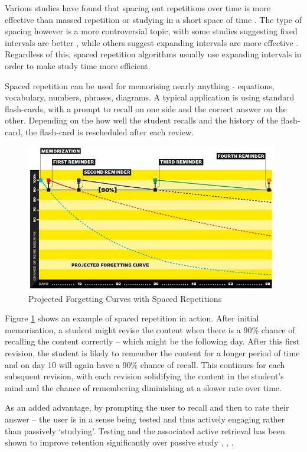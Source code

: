 Various studies have found that spacing out repetitions over time is
more effective than massed repetition or studying in a short space of time \cite{distributed_massed_2005}.
The type of spacing however is a more controversial topic, with some studies suggesting
fixed intervals are better \cite{fixed_intervals_2005}, while others suggest expanding intervals
are more effective \cite{effects_of_spacing_1963}. Regardless of this, spaced
repetition algorithms usually use expanding intervals in order to make study
time more efficient.

Spaced repetition can be used for memorising
nearly anything - equations, vocabulary, numbers, phrases, diagrams. A typical application
is using standard flash-cards, with a prompt to recall on one side and the correct answer on
the other. Depending on the how well the student recalls and the history of the flash-card, the
flash-card is rescheduled after each review. 

\begin{figure}[h!]
\includegraphics[width=11cm]{img/wired_forgetcurve.jpg}
\caption{Projected Forgetting Curves with Spaced Repetitions \cite{wolf_want_2008}}
\label{fig_projectedforgettingcurve}
\end{figure}

Figure \ref{fig_projectedforgettingcurve} shows an example of spaced repetition in
action. After initial memorisation, a student might revise the content when there
is a 90\% chance of recalling the content correctly -- which might be the following day.
After this first revision, the student is likely to remember the content for a longer
period of time and on day 10 will again have a 90\% chance of recall. This continues
for each subsquent revision, with each revision solidifying the content in the student's
mind and the chance of remembering diminishing at a slower rate over time.

As an added advantage, by prompting the user to recall and then to rate their answer -- the user
is in a sense being tested and thus actively engaging rather than passively `studying'.
Testing and the associated active retrieval has been shown to improve retention
significantly over passive study \cite{effects_of_recall_tests_1969},
\cite{retrieval_for_learning_2008}, \cite{power_of_testing_memory_2006}.

